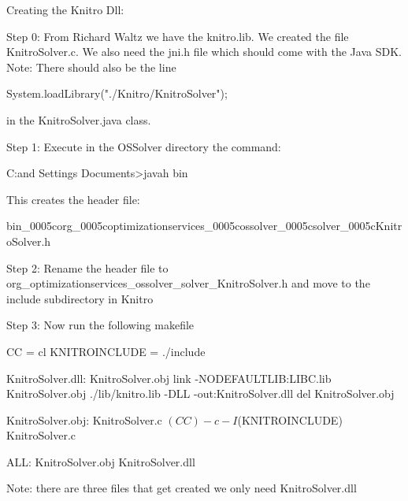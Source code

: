 Creating the Knitro Dll:

Step 0:  From Richard Waltz we have the knitro.lib. We created the
file KnitroSolver.c. We also need the jni.h file which should come
with the Java SDK.  Note:  There should also be the line

System.loadLibrary("./Knitro/KnitroSolver");

in the KnitroSolver.java class.

Step 1: Execute in the OSSolver directory the command:


C:\Documents and Settings\kmartin\My
Documents\research\junma\OS\OSSolver>javah
bin\org\optimizationservices\ossolver\solver\KnitroSolver

This creates the header file:

bin_0005corg_0005coptimizationservices_0005cossolver_0005csolver_0005cKnitroSolver.h


Step 2: Rename the header file to
org_optimizationservices_ossolver_solver_KnitroSolver.h and move
to the include subdirectory in Knitro


Step 3:  Now run the following makefile

CC = cl KNITROINCLUDE = ./include



KnitroSolver.dll: KnitroSolver.obj
    link   -NODEFAULTLIB:LIBC.lib KnitroSolver.obj ./lib/knitro.lib -DLL -out:KnitroSolver.dll
    del KnitroSolver.obj

KnitroSolver.obj: KnitroSolver.c
    $(CC) -c  -I$(KNITROINCLUDE) KnitroSolver.c



ALL: KnitroSolver.obj KnitroSolver.dll



Note: there are three files that get created we only need
KnitroSolver.dll
